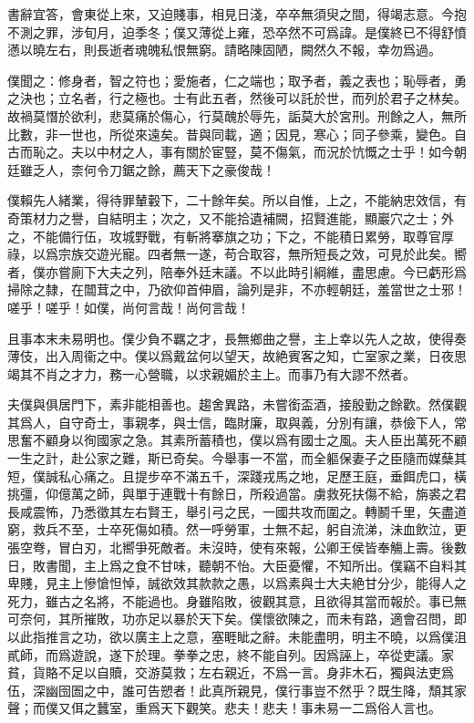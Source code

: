 書辭宜答，會東從上來，又迫賤事，相見日淺，卒卒無須臾之間，得竭志意。今抱不測之罪，涉旬月，迫季冬；僕又薄從上雍，恐卒然不可爲諱。是僕終已不得舒憤懣以曉左右，則長逝者魂魄私恨無窮。請略陳固陋，闕然久不報，幸勿爲過。

僕聞之：修身者，智之符也；愛施者，仁之端也；取予者，義之表也；恥辱者，勇之決也；立名者，行之極也。士有此五者，然後可以託於世，而列於君子之林矣。故禍莫憯於欲利，悲莫痛於傷心，行莫醜於辱先，詬莫大於宮刑。刑餘之人，無所比數，非一世也，所從來遠矣。昔與同載，適；因見，寒心；同子參乘，變色。自古而恥之。夫以中材之人，事有關於宦豎，莫不傷氣，而況於忼慨之士乎！如今朝廷雖乏人，柰何令刀鋸之餘，薦天下之豪俊哉！

僕賴先人緒業，得待罪輦轂下，二十餘年矣。所以自惟，上之，不能納忠效信，有奇策材力之譽，自結明主；次之，又不能拾遺補闕，招賢進能，顯巖穴之士；外之，不能備行伍，攻城野戰，有斬將搴旗之功；下之，不能積日累勞，取尊官厚祿，以爲宗族交遊光寵。四者無一遂，苟合取容，無所短長之效，可見於此矣。嚮者，僕亦嘗廁下大夫之列，陪奉外廷末議。不以此時引綱維，盡思慮。今已虧形爲掃除之隸，在闒茸之中，乃欲仰首伸眉，論列是非，不亦輕朝廷，羞當世之士邪！嗟乎！嗟乎！如僕，尚何言哉！尚何言哉！

且事本末未易明也。僕少負不羈之才，長無鄉曲之譽，主上幸以先人之故，使得奏薄伎，出入周衞之中。僕以爲戴盆何以望天，故絶賓客之知，亡室家之業，日夜思竭其不肖之才力，務一心營職，以求親媚於主上。而事乃有大謬不然者。

夫僕與俱居門下，素非能相善也。趨舍異路，未嘗銜盃酒，接殷勤之餘歡。然僕觀其爲人，自守奇士，事親孝，與士信，臨財廉，取與義，分別有讓，恭儉下人，常思奮不顧身以徇國家之急。其素所蓄積也，僕以爲有國士之風。夫人臣出萬死不顧一生之計，赴公家之難，斯已奇矣。今舉事一不當，而全軀保妻子之臣隨而媒蘖其短，僕誠私心痛之。且提步卒不滿五千，深踐戎馬之地，足歷王庭，垂餌虎口，橫挑彊，仰億萬之師，與單于連戰十有餘日，所殺過當。虜救死扶傷不給，旃裘之君長咸震怖，乃悉徵其左右賢王，舉引弓之民，一國共攻而圍之。轉鬭千里，矢盡道窮，救兵不至，士卒死傷如積。然一呼勞軍，士無不起，躬自流涕，沬血飲泣，更張空弮，冒白刃，北嚮爭死敵者。未沒時，使有來報，公卿王侯皆奉觴上壽。後數日，敗書聞，主上爲之食不甘味，聽朝不怡。大臣憂懼，不知所出。僕竊不自料其卑賤，見主上慘愴怛悼，誠欲效其款款之愚，以爲素與士大夫絶甘分少，能得人之死力，雖古之名將，不能過也。身雖陷敗，彼觀其意，且欲得其當而報於。事已無可奈何，其所摧敗，功亦足以暴於天下矣。僕懷欲陳之，而未有路，適會召問，即以此指推言之功，欲以廣主上之意，塞睚眦之辭。未能盡明，明主不曉，以爲僕沮貳師，而爲遊說，遂下於理。拳拳之忠，終不能自列。因爲誣上，卒從吏議。家貧，貨賂不足以自贖，交游莫救；左右親近，不爲一言。身非木石，獨與法吏爲伍，深幽囹圄之中，誰可告愬者！此真所親見，僕行事豈不然乎？既生降，頹其家聲；而僕又佴之蠶室，重爲天下觀笑。悲夫！悲夫！事未易一二爲俗人言也。

